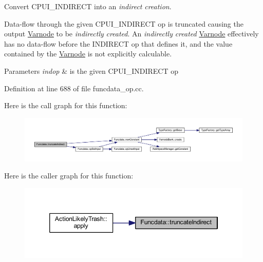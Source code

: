 Convert C\+P\+U\+I\+\_\+\+I\+N\+D\+I\+R\+E\+CT into an {\itshape indirect} {\itshape creation}. 

Data-\/flow through the given C\+P\+U\+I\+\_\+\+I\+N\+D\+I\+R\+E\+CT op is truncated causing the output \mbox{\hyperlink{class_varnode}{Varnode}} to be {\itshape indirectly} {\itshape created}. An {\itshape indirectly} {\itshape created} \mbox{\hyperlink{class_varnode}{Varnode}} effectively has no data-\/flow before the I\+N\+D\+I\+R\+E\+CT op that defines it, and the value contained by the \mbox{\hyperlink{class_varnode}{Varnode}} is not explicitly calculable. 
\begin{DoxyParams}{Parameters}
{\em indop} & is the given C\+P\+U\+I\+\_\+\+I\+N\+D\+I\+R\+E\+CT op \\
\hline
\end{DoxyParams}


Definition at line 688 of file funcdata\+\_\+op.\+cc.

Here is the call graph for this function\+:
\nopagebreak
\begin{figure}[H]
\begin{center}
\leavevmode
\includegraphics[width=350pt]{class_funcdata_a964a7c66123c0b8ed931cf131521ecdf_cgraph}
\end{center}
\end{figure}
Here is the caller graph for this function\+:
\nopagebreak
\begin{figure}[H]
\begin{center}
\leavevmode
\includegraphics[width=346pt]{class_funcdata_a964a7c66123c0b8ed931cf131521ecdf_icgraph}
\end{center}
\end{figure}
\mbox{\label{class_funcdata_ae24d203d78d38285de2c4c8b14074769}} 
